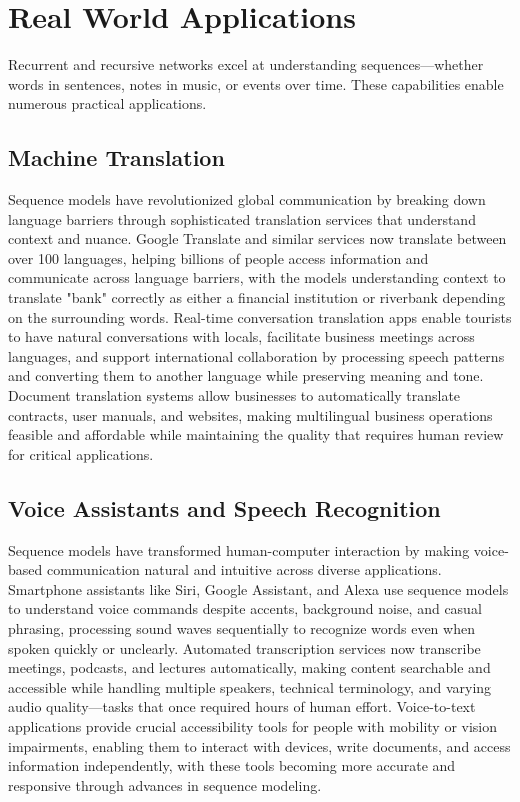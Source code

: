 
\section{Real World Applications}
\label{sec:sequence-real-world}


Recurrent and recursive networks excel at understanding sequences—whether words in sentences, notes in music, or events over time. These capabilities enable numerous practical applications.

\subsection{Machine Translation}

Sequence models have revolutionized global communication by breaking down language barriers through sophisticated translation services that understand context and nuance. Google Translate and similar services now translate between over 100 languages, helping billions of people access information and communicate across language barriers, with the models understanding context to translate "bank" correctly as either a financial institution or riverbank depending on the surrounding words. Real-time conversation translation apps enable tourists to have natural conversations with locals, facilitate business meetings across languages, and support international collaboration by processing speech patterns and converting them to another language while preserving meaning and tone. Document translation systems allow businesses to automatically translate contracts, user manuals, and websites, making multilingual business operations feasible and affordable while maintaining the quality that requires human review for critical applications.

\subsection{Voice Assistants and Speech Recognition}

Sequence models have transformed human-computer interaction by making voice-based communication natural and intuitive across diverse applications. Smartphone assistants like Siri, Google Assistant, and Alexa use sequence models to understand voice commands despite accents, background noise, and casual phrasing, processing sound waves sequentially to recognize words even when spoken quickly or unclearly. Automated transcription services now transcribe meetings, podcasts, and lectures automatically, making content searchable and accessible while handling multiple speakers, technical terminology, and varying audio quality—tasks that once required hours of human effort. Voice-to-text applications provide crucial accessibility tools for people with mobility or vision impairments, enabling them to interact with devices, write documents, and access information independently, with these tools becoming more accurate and responsive through advances in sequence modeling.


